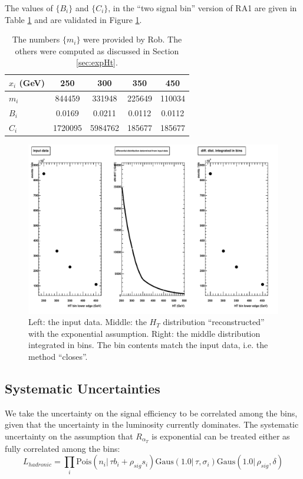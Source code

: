 The values of $\{B_i\}$ and $\{C_i\}$, in the ``two signal bin'' version of RA1 are given in Table \ref{tab:bsandcs}
and are validated in Figure \ref{fig:validationPlots}.
\begin{table}[hb]
  \begin{tabular}{| l | c c c c |}
    \hline
    $x_i$ (GeV) & 250 & 300 & 350 & 450 \\
    \hline
    $m_i$ & 844459 & 331948 & 225649 & 110034 \\
    $B_i$ & 0.0169 & 0.0211 & 0.0112 & 0.0112 \\
    $C_i$ & 1720095 & 5984762 & 185677 & 185677 \\
    \hline
  \end{tabular}
  \caption{The numbers $\{m_i\}$ were provided by Rob.  The others were computed as discussed in Section \ref{sec:expHt}.}
  \label{tab:bsandcs}
\end{table}

\begin{figure}[ht]
  \includegraphics[width=1.2\textwidth]{totalBackgroundExpHt}
  \caption{Left: the input data.
    Middle: the $H_T$ distribution ``reconstructed'' with the exponential assumption.
    Right: the middle distribution integrated in bins.  The bin contents match the input data, i.e. the method ``closes''.}
  \label{fig:validationPlots}
\end{figure}

\subsection{Systematic Uncertainties}
\label{sec:sysUnc}
We take the uncertainty on the signal efficiency to be correlated among the bins, given that the uncertainty in the luminosity currently dominates.
The systematic uncertainty on the assumption that $R_{\alpha_T}$ is exponential can be treated either as 
fully correlated among the bins:
\begin{equation}
L_{hadronic}=\prod_i \mathrm{Pois}(n_i |\, \tau b_i + \rho_{sig}s_i)\mathrm{Gaus}(1.0 |\,\tau, \sigma_i)\mathrm{Gaus}(1.0 |\,\rho_{sig}, \delta)
\end{equation}

